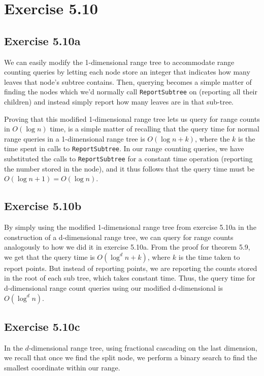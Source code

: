 \documentclass[11pt,a4paper]{article}
\begin{document}
\section{Exercise 5.10}

\subsection{Exercise 5.10a}

We can easily modify the 1-dimensional range tree to accommodate range
counting queries by letting each node store an integer that indicates
how many leaves that node's subtree contains. Then, querying becomes a
simple matter of finding the nodes which we'd normally call
\verb+ReportSubtree+ on (reporting all their children) and instead
simply report how many leaves are in that sub-tree.

Proving that this modified 1-dimensional range tree lets us query for
range counts in $O(\log n)$ time, is a simple matter of recalling that
the query time for normal range queries in a 1-dimensional range tree
is $O(\log n + k)$, where the $k$ is the time spent in calls to
\verb+ReportSubtree+. In our range counting queries, we have
substituted the calls to \verb+ReportSubtree+ for a constant time
operation (reporting the number stored in the node), and it thus
follows that the query time must be $O(\log n + 1) = O(\log n)$.

\subsection{Exercise 5.10b}

By simply using the modified 1-dimensional range tree from exercise
5.10a in the construction of a d-dimensional range tree, we can query
for range counts analogously to how we did it in exercise 5.10a. From
the proof for theorem 5.9, we get that the query time is $O(\log^d n +
k)$, where $k$ is the time taken to report points. But instead of
reporting points, we are reporting the counts stored in the root of
each sub tree, which takes constant time. Thus, the query time for
d-dimensional range count queries using our modified d-dimensional is
$O(\log^d n)$.

\subsection{Exercise 5.10c}

In the $d$-dimensional range tree, using fractional cascading on the last
dimension, we recall that once we find the split node, we perform a binary
search to find the smallest coordinate within our range.
\end{document}
